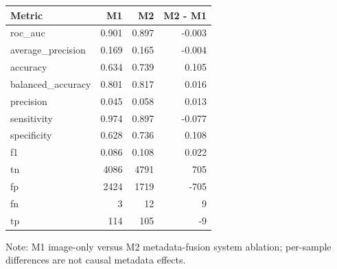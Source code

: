 \begin{table}[t]
\centering
\small
\begin{tabular}{lrrr}
\toprule
Metric & M1 & M2 & M2 - M1 \\
\midrule
roc\_auc & 0.901 & 0.897 & -0.003 \\
average\_precision & 0.169 & 0.165 & -0.004 \\
accuracy & 0.634 & 0.739 & 0.105 \\
balanced\_accuracy & 0.801 & 0.817 & 0.016 \\
precision & 0.045 & 0.058 & 0.013 \\
sensitivity & 0.974 & 0.897 & -0.077 \\
specificity & 0.628 & 0.736 & 0.108 \\
f1 & 0.086 & 0.108 & 0.022 \\
tn & 4086 & 4791 & 705 \\
fp & 2424 & 1719 & -705 \\
fn & 3 & 12 & 9 \\
tp & 114 & 105 & -9 \\
\bottomrule
\end{tabular}
\vspace{2pt}
\parbox{0.98\textwidth}{\footnotesize Note: M1 image-only versus M2 metadata-fusion system ablation; per-sample differences are not causal metadata effects.}
\end{table}

